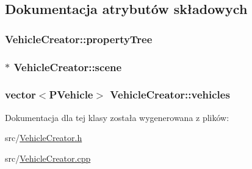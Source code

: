 \subsection{Dokumentacja atrybutów składowych}
\hypertarget{class_vehicle_creator_aa9ad6fb2dc9ff1b715196ae914c6925e}{
\subsubsection[{property\-Tree}]{ Vehicle\-Creator\-::property\-Tree\hspace{0.3cm}{\ttfamily [private]}}}\label{class_vehicle_creator_aa9ad6fb2dc9ff1b715196ae914c6925e}
\hypertarget{class_vehicle_creator_a53e33d385593f7473da5afa14715e569}{
\subsubsection[{scene}]{$\ast$ Vehicle\-Creator\-::scene\hspace{0.3cm}{\ttfamily [private]}}}\label{class_vehicle_creator_a53e33d385593f7473da5afa14715e569}
\hypertarget{class_vehicle_creator_a7cd2f07f6b6d9a8299bd2c6b5657f292}{
\subsubsection[{vehicles}]{\setlength{\rightskip}{0pt plus 5cm}vector$<${\bf P\-Vehicle}$>$ Vehicle\-Creator\-::vehicles\hspace{0.3cm}{\ttfamily [private]}}}\label{class_vehicle_creator_a7cd2f07f6b6d9a8299bd2c6b5657f292}


Dokumentacja dla tej klasy została wygenerowana z plików\-:\begin{DoxyCompactItemize}
\item 
src/\hyperlink{_vehicle_creator_8h}{Vehicle\-Creator.\-h}\item 
src/\hyperlink{_vehicle_creator_8cpp}{Vehicle\-Creator.\-cpp}\end{DoxyCompactItemize}
